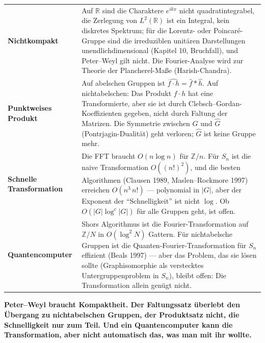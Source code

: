 \begin{warnung}
\begin{center}
{\small
\renewcommand{\arraystretch}{1.5}
\begin{tabular}{@{}P{3.2cm}P{5.4cm}@{}}
\toprule
\textbf{Nichtkompakt} & Auf $\mathbb R$ sind die Charaktere $e^{ikx}$ nicht quadratintegrabel, die Zerlegung von $L^{2}(\mathbb R)$ ist ein Integral, kein diskretes Spektrum; für die Lorentz- oder Poincaré-Gruppe sind die irreduziblen unitären Darstellungen unendlichdimensional (Kapitel 10, Bruchfall), und Peter--Weyl gilt nicht. Die Fourier-Analyse wird zur Theorie der Plancherel-Maße (Harish-Chandra).\\
\textbf{Punktweises Produkt} & Auf abelschen Gruppen ist $\widehat{f\cdot h} = \hat f * \hat h$. Auf nichtabelschen: Das Produkt $f\cdot h$ hat eine Transformierte, aber sie ist durch Clebsch--Gordan-Koeffizienten gegeben, nicht durch Faltung der Matrizen. Die Symmetrie zwischen $G$ und $\hat G$ (Pontrjagin-Dualität) geht verloren; $\hat G$ ist keine Gruppe mehr.\\
\textbf{Schnelle Transformation} & Die FFT braucht $O(n\log n)$ für $\mathbb Z/n$. Für $S_n$ ist die naive Transformation $O((n!)^{2})$, und die besten Algorithmen (Clausen 1989, Maslen--Rockmore 1997) erreichen $O(n^{3}\,n!)$ --- polynomial in $|G|$, aber der Exponent der \enquote{Schnelligkeit} ist nicht $\log$. Ob $O(|G|\log^{c}|G|)$ für alle Gruppen geht, ist offen.\\
\textbf{Quantencomputer} & Shors Algorithmus ist die Fourier-Transformation auf $\mathbb Z/N$ in $O(\log^{2}N)$ Gattern. Für nichtabelsche Gruppen ist die Quanten-Fourier-Transformation für $S_n$ effizient (Beals 1997) --- aber das Problem, das sie lösen sollte (Graphisomorphie als verstecktes Untergruppenproblem in $S_n$), bleibt offen: Die Transformation allein genügt nicht.\\
\bottomrule
\end{tabular}}
\end{center}

\begin{center}
\begin{minipage}{0.9\textwidth}
\textbf{Peter--Weyl braucht Kompaktheit. Der Faltungssatz überlebt den Übergang zu nichtabelschen Gruppen, der Produktsatz nicht, die Schnelligkeit nur zum Teil. Und ein Quantencomputer kann die Transformation, aber nicht automatisch das, was man mit ihr wollte.}
\end{minipage}
\end{center}
\end{warnung}

